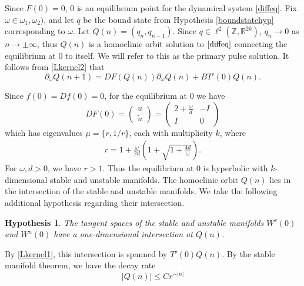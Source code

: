 \documentclass[12pt]{elsarticle}
\def\R{{\mathbb R}}
\def\Z{{\mathbb Z}}
\newtheorem{hypothesis}{Hypothesis}
\begin{document}
Since $F(0) = 0$, 0 is an equilibrium point for the dynamical system \eqref{diffeq}. Fix $\omega \in \omega_1, \omega_2)$, and let $q$ be the bound state from Hypothesis \ref{boundstatehyp} corresponding to $\omega$. Let $Q(n) = ( q_n, q_{n-1} )$. Since $q \in \ell^2(\Z, \R^{2k})$, $q_n \rightarrow 0$ as $n \rightarrow \pm \infty$, thus $Q(n)$ is a homoclinic orbit solution to $\eqref{diffeq}$ connecting the equilibrium at 0 to itself. We will refer to this as the primary pulse solution. It follows from \eqref{Lkernel2} that
\begin{equation}\label{DFkernel2}
\partial_\omega Q(n+1) = DF(Q(n)) \partial_\omega Q(n) + B T'(0)Q(n).
\end{equation}

Since $f(0) = Df(0) = 0$, for the equilibrium at 0 we have
\begin{equation}\label{DF0}
DF(0) = \begin{pmatrix}u \\ \tilde{u} \end{pmatrix} =
\begin{pmatrix}
2 + \frac{\omega}{d} & -I  \\
I & 0
\end{pmatrix} 
\end{equation}
which has eigenvalues $\mu = \{r, 1/r\}$, each with multiplicity $k$, where
\begin{align}\label{eigr}
r = 1 + \frac{\omega}{2 d} \left( 1 + \sqrt{1 + \frac{4 d}{\omega}} \right).
\end{align}
For $\omega, d > 0$, we have $r > 1$. Thus the equilibrium at 0 is hyperbolic with $k$-dimensional stable and unstable manifolds. The homoclinic orbit $Q(n)$ lies in the intersection of the stable and unstable manifolds. We take the following additional hypothesis regarding their intersection.

\begin{hypothesis}\label{intersectionhyp}
The tangent spaces of the stable and unstable manifolds $W^s(0)$ and $W^u(0)$ have a one-dimensional intersection at $Q(n)$.
\end{hypothesis}

\noindent By \eqref{Lkernel1}, this intersection is spanned by $T'(0)Q(n)$. By the stable manifold theorem, we have the decay rate
\begin{equation}\label{Qdecay}
|Q(n)| \leq C r^{-|n|}
\end{equation}
\end{document}
